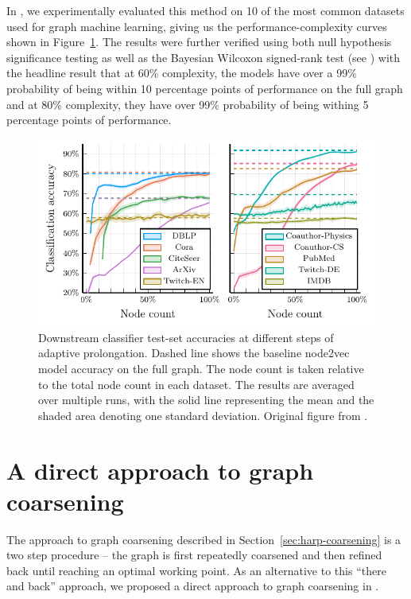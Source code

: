 In \cite{dedic_balancing_2024}, we experimentally evaluated this method on 10 of the most common datasets used for graph machine learning, giving us the performance-complexity curves shown in Figure~\ref{fig:adaptive-coarsening}. The results were further verified using both null hypothesis significance testing as well as the Bayesian Wilcoxon signed-rank test (see \cite{benavoli_bayesian_2014}) with the headline result that at 60\% complexity, the models have over a 99\% probability of being within 10 percentage points of performance on the full graph and at 80\% complexity, they have over 99\% probability of being withing 5 percentage points of performance.

\begin{figure}
	\includegraphics[width=0.8\linewidth]{images/adaptive-coarsening/adaptive-coarsening.pdf}
	\caption{Downstream classifier test-set accuracies at different steps of adaptive prolongation. Dashed line shows the baseline node2vec model accuracy on the full graph. The node count is taken relative to the total node count in each dataset. The results are averaged over multiple runs, with the solid line representing the mean and the shaded area denoting one standard deviation. Original figure from \cite{dedic_balancing_2024}.}
	\label{fig:adaptive-coarsening}
\end{figure}

\section{A direct approach to graph coarsening}
\label{sec:direct-coarsening}

The approach to graph coarsening described in Section~\ref{sec:harp-coarsening} is a two step procedure -- the graph is first repeatedly coarsened and then refined back until reaching an optimal working point. As an alternative to this \enquote{there and back} approach, we proposed a direct approach to graph coarsening in \cite{prochazka_scalable_2022}.

